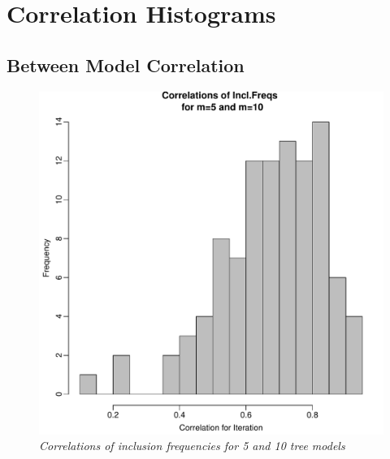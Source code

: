 \documentclass[12pt]{article}
\begin{document}
\section{Correlation Histograms}
\subsection*{Between Model Correlation}
\begin{figure}[H]
\centerline{\includegraphics[scale=.6]{corList.pdf}}
\caption{\it Correlations of inclusion frequencies for 5 and 10 tree models}
\label{fig:version1}  
\end{figure}
\end{document}
